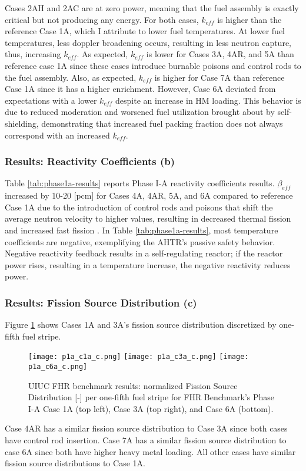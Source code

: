 Cases 2AH and 2AC are at zero power, meaning that the fuel assembly is exactly 
critical but not producing any energy. 
For both cases, $k_{eff}$ is higher than the reference Case 1A, which I attribute to 
lower fuel temperatures. 
At lower fuel temperatures, less doppler broadening occurs, resulting in less neutron 
capture, thus, increasing $k_{eff}$. 
As expected, $k_{eff}$ is lower for Cases 3A, 4AR, and 5A than reference case 
1A since these cases introduce burnable poisons and control rods to the fuel 
assembly. 
Also, as expected, $k_{eff}$ is higher for Case 7A than reference Case 1A since 
it has a higher enrichment. 
However, Case 6A deviated from expectations with a lower $k_{eff}$ despite an increase 
in \acrlong{HM} loading. 
This behavior is due to reduced moderation and worsened fuel utilization brought about 
by self-shielding, demonstrating that increased fuel packing fraction does not 
always correspond with an increased $k_{eff}$. 

\subsubsection{Results: Reactivity Coefficients (b)}
Table \ref{tab:phase1a-results} reports Phase I-A reactivity coefficients results. 
$\beta_{eff}$ increased by 10-20 [pcm] for Cases 4A, 4AR, 5A, and 6A compared to
reference Case 1A due to the introduction of control rods and poisons that 
shift the average neutron velocity to higher values, resulting in decreased
thermal fission and increased fast fission \cite{torabi_neutronic_2018}.
In Table \ref{tab:phase1a-results}, most temperature coefficients are negative, 
exemplifying the \gls{AHTR}'s passive safety behavior. 
Negative reactivity feedback results in a self-regulating reactor; if the reactor 
power rises, resulting in a temperature increase, the negative reactivity
reduces power. 

\subsubsection{Results: Fission Source Distribution (c)}
Figure \ref{fig:phase1a-c} shows Cases 1A and 3A's fission source distribution 
discretized by one-fifth fuel stripe. 
\begin{figure}[htbp]
    \centering
    \texttt{[image: p1a\_c1a\_c.png]} 
    \texttt{[image: p1a\_c3a\_c.png]} 
    \texttt{[image: p1a\_c6a\_c.png]} 
    \caption{\gls{UIUC} \gls{FHR} benchmark results: normalized Fission Source 
    Distribution [-] per one-fifth fuel stripe for \acrlong{FHR} Benchmark's Phase I-A 
    Case 1A (top left), Case 3A (top right), and Case 6A (bottom).}
    \label{fig:phase1a-c}
\end{figure}
Case 4AR has a similar fission source distribution to Case 3A since both 
cases have control rod insertion. 
Case 7A has a similar fission source distribution to case 6A since both have 
higher heavy metal loading. 
All other cases have similar fission source distributions to Case 1A. 

